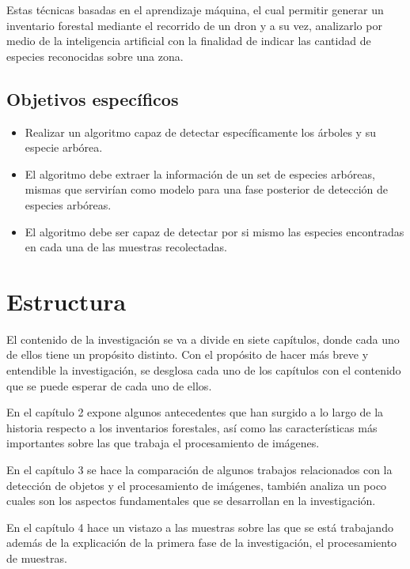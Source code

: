 Estas técnicas  basadas en el aprendizaje máquina, el cual permitir
generar un inventario forestal mediante el recorrido de un dron y a su vez, analizarlo por medio de la inteligencia artificial con la finalidad de indicar las cantidad de especies reconocidas sobre una zona.

\subsection{Objetivos específicos}
\begin{itemize}
\item Realizar un algoritmo capaz de detectar específicamente los árboles y su especie arbórea.
\end{itemize}

\begin{itemize}
\item El algoritmo debe extraer la información de un set de especies arbóreas, mismas que servirían como modelo para una fase posterior de detección de especies arbóreas.
\end{itemize}

\begin{itemize}
\item El algoritmo debe ser capaz de detectar por si mismo las especies encontradas en cada una de las muestras recolectadas.
\end{itemize}

\pagebreak

\section{Estructura}
El contenido de la investigación se va a divide en siete capítulos, donde cada uno de ellos tiene un propósito distinto. Con el propósito de hacer más breve y entendible la investigación, se desglosa cada uno de los capítulos con el contenido que se puede esperar de cada uno de ellos.

En el capítulo 2 expone algunos antecedentes que han surgido a lo largo
de la historia respecto a los inventarios forestales, así como las características más importantes sobre las que trabaja el procesamiento de imágenes.

En el capítulo 3 se hace la comparación de algunos trabajos relacionados con la detección de objetos y el procesamiento de imágenes, también analiza un poco cuales son los aspectos fundamentales que se desarrollan en la investigación.

En el capítulo 4 hace un vistazo a las muestras sobre las que se está trabajando además de la explicación de la primera fase de la investigación, el procesamiento de muestras.

